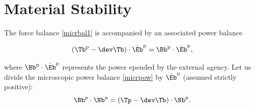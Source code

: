 \section{Material Stability}
The force balance \eqref{micrbal1} is accompanied by an associated power balance
\begin{definition}
	\begin{equation}\label{micrpow}
	(\Tb^{\rm p}-\dev\Tb)\cdot\dot{\Eb}^{\rm p}=\Bb^{\rm p}\cdot \dot{\Eb}^{\rm p},
\end{equation}
\end{definition}
where $\Bb^{\rm p}\cdot \dot{\Eb}^{\rm p}$ represents the power epended by the external agency. Let us divide the microscopic power balance \eqref{micrpow} by $\dot{\Eb}^{\rm p}$
(assumed strictly positive):
\begin{equation}
\Bb^{\rm p}\cdot \Nb^{\rm p}=(\Tp-\dev\Tb)\cdot \Nb^{\rm p}.
\end{equation}
%
%
